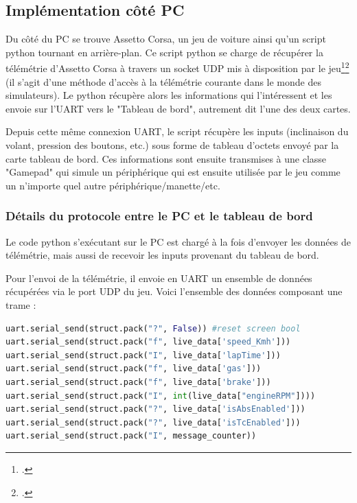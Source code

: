 \documentclass[french, 11pt]{article}
\begin{document}
        \subsection{Implémentation côté PC}

        Du côté du PC se trouve Assetto Corsa, un jeu de voiture ainsi qu'un script python tournant en arrière-plan. Ce script python se charge de récupérer la télémétrie d'Assetto Corsa à travers un socket UDP mis à disposition par le jeu\footcite{telem}\footcite{telem_cli} (il s'agit d'une méthode d'accès à la télémétrie courante dans le monde des simulateurs). Le python récupère alors les informations qui l'intéressent et les envoie sur l'UART vers le "Tableau de bord", autrement dit l'une des deux cartes. 
		
		Depuis cette même connexion UART, le script récupère les inputs (inclinaison du volant, pression des boutons, etc.) sous forme de tableau d'octets envoyé par la carte tableau de bord. Ces informations sont ensuite transmises à une classe "Gamepad" qui simule un périphérique qui est ensuite utilisée par le jeu comme un n'importe quel autre périphérique/manette/etc.

		
		\subsubsection{Détails du protocole entre le PC et le tableau de bord}
		\label{telemetrie}

			Le code python s'exécutant sur le PC est chargé à la fois d'envoyer les données de télémétrie, mais aussi de recevoir les inputs provenant du tableau de bord.

			Pour l'envoi de la télémétrie, il envoie en UART un ensemble de données récupérées via le port UDP du jeu. Voici l'ensemble des données composant une trame :

			\begin{lstlisting}[language=python, caption=Données télémétriques envoyées par le python]
uart.serial_send(struct.pack("?", False)) #reset screen bool
uart.serial_send(struct.pack("f", live_data['speed_Kmh']))
uart.serial_send(struct.pack("I", live_data['lapTime']))
uart.serial_send(struct.pack("f", live_data['gas']))
uart.serial_send(struct.pack("f", live_data['brake']))
uart.serial_send(struct.pack("I", int(live_data["engineRPM"])))
uart.serial_send(struct.pack("?", live_data['isAbsEnabled']))
uart.serial_send(struct.pack("?", live_data['isTcEnabled']))
uart.serial_send(struct.pack("I", message_counter))
			\end{lstlisting}
\end{document}
